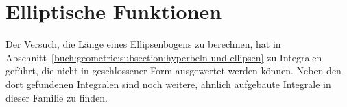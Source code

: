%
%
%
\chapter{Elliptische Funktionen
\label{buch:chapter:geometrie}}
\rhead{}

Der Versuch, die Länge eines Ellipsenbogens zu berechnen, hat
in Abschnitt~\ref{buch:geometrie:subsection:hyperbeln-und-ellipsen}
zu Integralen geführt, die nicht in geschlossener Form ausgewertet
werden können.
Neben den dort gefundenen Integralen sind noch weitere, ähnlich
aufgebaute Integrale in dieser Familie zu finden.






